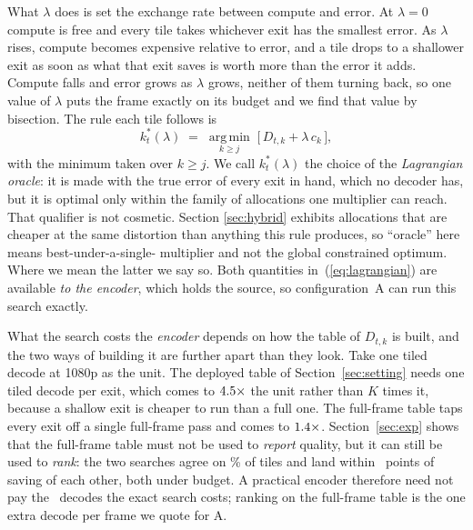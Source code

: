 \documentclass[10pt,twocolumn,letterpaper]{article}
\begin{document}
What $\lambda$ does is set the exchange rate between compute and error. At
$\lambda = 0$ compute is free and every tile takes whichever exit has the
smallest error. As $\lambda$ rises, compute becomes expensive relative to error,
and a tile drops to a shallower exit as soon as what that exit saves is worth
more than the error it adds. Compute falls and error grows as $\lambda$ grows,
neither of them turning back, so one value of $\lambda$ puts the frame exactly on
its budget and we find that value by bisection. The rule each tile follows is
\begin{equation}
k^{*}_t(\lambda) \;=\; \operatorname*{arg\,min}_{k \ge j} \; \bigl[\, D_{t,k} + \lambda\, c_k \,\bigr],
\label{eq:lagrangian}
\end{equation}
with the minimum taken over $k \ge j$. We call $k^{*}_t(\lambda)$ the choice of
the \emph{Lagrangian oracle}: it is made with the true error of every exit in
hand, which no decoder has, but it is optimal only within the family of
allocations one multiplier can reach. That qualifier is not cosmetic. Section
\ref{sec:hybrid} exhibits allocations that are cheaper at the same distortion
than anything this rule produces, so ``oracle'' here means best-under-a-single-%
multiplier and not the global constrained optimum. Where we mean the latter we
say so. Both quantities in~(\ref{eq:lagrangian}) are available \emph{to the
encoder}, which holds the source, so configuration~A can run this search exactly.

What the search costs the \emph{encoder} depends on how the table of $D_{t,k}$ is
built, and the two ways of building it are further apart than they look. Take one
tiled decode at 1080p as the unit. The deployed table of
Section~\ref{sec:setting} needs one tiled decode per exit, which comes to
$4.5\times$ the unit rather than $K$ times it, because a shallow exit is cheaper
to run than a full one. The full-frame table taps every exit off a single
full-frame pass and comes to $1.4\times$. Section~\ref{sec:exp} shows that the
full-frame table must not be used to \emph{report} quality, but it can still be
used to \emph{rank}: the two searches agree on \EncAgree\% of tiles and land
within \EncSavingGap\ points of saving of each other, both under budget. A
practical encoder therefore need not pay the \EncDeployedX\ decodes the exact
search costs; ranking on the full-frame table is the one extra decode per frame
we quote for A.
\end{document}
